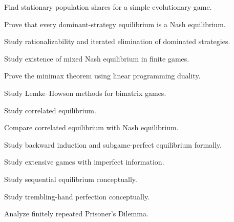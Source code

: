 \begin{exercise}[3]
Find stationary population shares for a simple evolutionary game.
\end{exercise}

\begin{exercise}[4]
Prove that every dominant-strategy equilibrium is a Nash equilibrium.
\end{exercise}

\begin{exercise}[4]
Study rationalizability and iterated elimination of dominated strategies.
\end{exercise}

\begin{exercise}[4]
Study existence of mixed Nash equilibrium in finite games.
\end{exercise}

\begin{exercise}[4]
Prove the minimax theorem using linear programming duality.
\end{exercise}

\begin{exercise}[4]
Study Lemke--Howson methods for bimatrix games.
\end{exercise}

\begin{exercise}[4]
Study correlated equilibrium.
\end{exercise}

\begin{exercise}[4]
Compare correlated equilibrium with Nash equilibrium.
\end{exercise}

\begin{exercise}[4]
Study backward induction and subgame-perfect equilibrium formally.
\end{exercise}

\begin{exercise}[4]
Study extensive games with imperfect information.
\end{exercise}

\begin{exercise}[4]
Study sequential equilibrium conceptually.
\end{exercise}

\begin{exercise}[4]
Study trembling-hand perfection conceptually.
\end{exercise}

\begin{exercise}[4]
Analyze finitely repeated Prisoner's Dilemma.
\end{exercise}

